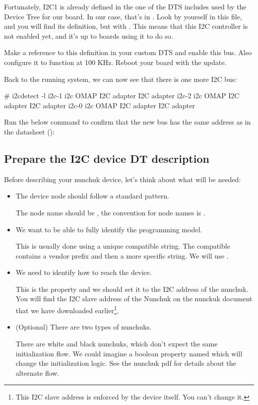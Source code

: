 Fortunately, I2C1 is already defined in the one of the DTS includes
used by the Device Tree for our board. In our case, that's in
. Look by yourself in this
file, and you will find its definition, but with . This means that this I2C controller is not enabled yet,
and it's up to boards using it to do so.

Make a reference to this definition in your custom DTS and enable this
bus. Also configure it to function at 100 KHz. Reboot your board with
the update.

Back to the running system, we can now see that there is one more
I2C bus:

\begin{bashinput}
# i2cdetect -l
i2c-1	i2c             OMAP I2C adapter                        I2C adapter
i2c-2	i2c             OMAP I2C adapter                        I2C adapter
i2c-0	i2c             OMAP I2C adapter                        I2C adapter
\end{bashinput}

Run the below command to confirm that the new bus has the same address
as in the datasheet ():


\subsection{Prepare the I2C device DT description}

Before describing your nunchuk device, let's think about what will be
needed:
\begin{itemize}
\item The device node should follow a standard pattern.

  The node name should be , the convention for node
  names is .

\item We want to be able to fully identify the programming model.

  This is usually done using a unique compatible string. The compatible
  contains a vendor prefix and then a more specific string. We will use
  .

\item We need to identify how to reach the device.

  This is the  property and we should set it to the I2C
  address of the nunchuk. You will find the I2C slave address of the
  Nunchuk on the nunckuk document that we have downloaded
  earlier\footnote{This I2C slave address is enforced by the device
    itself. You can't change it.}.

\item (Optional) There are two types of nunchuks.

  There are white and black nunchuks, which don't expect the same
  initialization flow. We could imagine a boolean property named
   which will change the initialization
  logic. See the nunchuk pdf for details about the alternate flow.

\end{itemize}

